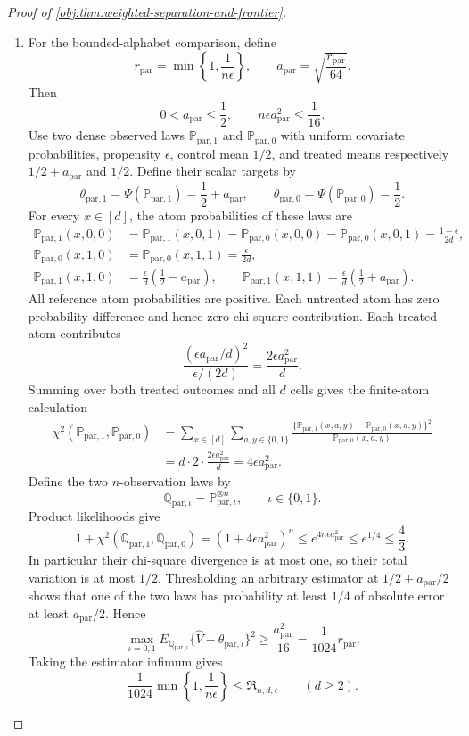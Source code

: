 \documentclass[11pt]{article}
\begin{document}
\begin{proof}[Proof of \cref{obj:thm:weighted-separation-and-frontier}]
\begin{enumerate}
\item
For the bounded-alphabet comparison, define
\[
r_{\mathrm{par}}=\min\left\{1,\frac1{n\epsilon}\right\},
\qquad
a_{\mathrm{par}}=\sqrt{\frac{r_{\mathrm{par}}}{64}}.
\]
Then
\[
0<a_{\mathrm{par}}\le\frac12,
\qquad
n\epsilon a_{\mathrm{par}}^2\le\frac1{16}.
\]
Use two dense observed laws \(\mathbb P_{\mathrm{par},1}\) and
\(\mathbb P_{\mathrm{par},0}\) with uniform covariate probabilities, propensity
\(\epsilon\), control mean \(1/2\), and treated means respectively
\(1/2+a_{\mathrm{par}}\) and \(1/2\). Define their scalar targets by
\[
\theta_{\mathrm{par},1}
=\Psi(\mathbb P_{\mathrm{par},1})=\frac12+a_{\mathrm{par}},
\qquad
\theta_{\mathrm{par},0}
=\Psi(\mathbb P_{\mathrm{par},0})=\frac12.
\]
For every \(x\in[d]\), the atom probabilities of these laws are
\[
\begin{aligned}
\mathbb P_{\mathrm{par},1}(x,0,0)
&=\mathbb P_{\mathrm{par},1}(x,0,1)
=\mathbb P_{\mathrm{par},0}(x,0,0)
=\mathbb P_{\mathrm{par},0}(x,0,1)
=\frac{1-\epsilon}{2d},\\
\mathbb P_{\mathrm{par},0}(x,1,0)
&=\mathbb P_{\mathrm{par},0}(x,1,1)=\frac{\epsilon}{2d},\\
\mathbb P_{\mathrm{par},1}(x,1,0)
&=\frac{\epsilon}{d}\left(\frac12-a_{\mathrm{par}}\right),
\qquad
\mathbb P_{\mathrm{par},1}(x,1,1)
=\frac{\epsilon}{d}\left(\frac12+a_{\mathrm{par}}\right).
\end{aligned}
\]
All reference atom probabilities are positive. Each untreated atom has zero probability difference and hence zero chi-square contribution. Each treated atom contributes
\[
\frac{(\epsilon a_{\mathrm{par}}/d)^2}{\epsilon/(2d)}
=\frac{2\epsilon a_{\mathrm{par}}^2}{d}.
\]
Summing over both treated outcomes and all \(d\) cells gives the finite-atom calculation
\[
\begin{aligned}
\chi^2(\mathbb P_{\mathrm{par},1},\mathbb P_{\mathrm{par},0})
&=\sum_{x\in[d]}\sum_{a,y\in\{0,1\}}
\frac{\{\mathbb P_{\mathrm{par},1}(x,a,y)
-\mathbb P_{\mathrm{par},0}(x,a,y)\}^2}
 {\mathbb P_{\mathrm{par},0}(x,a,y)}\\
&=d\cdot2\cdot\frac{2\epsilon a_{\mathrm{par}}^2}{d}
=4\epsilon a_{\mathrm{par}}^2.
\end{aligned}
\]
Define the two \(n\)-observation laws by
\[
\mathbb Q_{\mathrm{par},\iota}
=\mathbb P_{\mathrm{par},\iota}^{\otimes n},
\qquad \iota\in\{0,1\}.
\]
Product likelihoods give
\[
1+\chi^2(\mathbb Q_{\mathrm{par},1},\mathbb Q_{\mathrm{par},0})
=(1+4\epsilon a_{\mathrm{par}}^2)^n
\le e^{4n\epsilon a_{\mathrm{par}}^2}
\le e^{1/4}\le\frac43.
\]
In particular their chi-square divergence is at most one, so their total variation is at most \(1/2\). Thresholding an arbitrary estimator at
\(1/2+a_{\mathrm{par}}/2\) shows that one of the two laws has probability at least \(1/4\) of absolute error at least \(a_{\mathrm{par}}/2\). Hence
\[
\max_{\iota=0,1}
E_{\mathbb Q_{\mathrm{par},\iota}}
\{\widehat V-\theta_{\mathrm{par},\iota}\}^2
\ge\frac{a_{\mathrm{par}}^2}{16}
=\frac1{1024}r_{\mathrm{par}}.
\]
Taking the estimator infimum gives
\[
\frac1{1024}\min\left\{1,\frac1{n\epsilon}\right\}
\le\mathfrak R_{n,d,\epsilon}
\qquad(d\ge2).
\]


\end{enumerate}
\end{proof}
\end{document}
